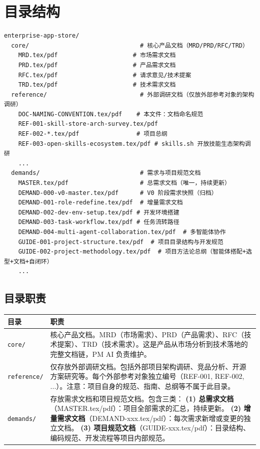 \documentclass[11pt,a4paper]{article}
\begin{document}
\section{目录结构}

\begin{lstlisting}[basicstyle=\ttfamily\footnotesize, frame=single]
enterprise-app-store/
  core/                               # 核心产品文档（MRD/PRD/RFC/TRD）
    MRD.tex/pdf                     # 市场需求文档
    PRD.tex/pdf                     # 产品需求文档
    RFC.tex/pdf                     # 请求意见/技术提案
    TRD.tex/pdf                     # 技术需求文档
  reference/                          # 外部调研文档（仅放外部参考对象的架构调研）
    DOC-NAMING-CONVENTION.tex/pdf    # 本文件：文档命名规范
    REF-001-skill-store-arch-survey.tex/pdf
    REF-002-*.tex/pdf                # 项目总纲
    REF-003-open-skills-ecosystem.tex/pdf # skills.sh 开放技能生态架构调研
    ...
  demands/                            # 需求与项目规范文档
    MASTER.tex/pdf                    # 总需求文档（唯一，持续更新）
    DEMAND-000-v0-master.tex/pdf      # V0 阶段需求快照（归档）
    DEMAND-001-role-redefine.tex/pdf  # 增量需求文档
    DEMAND-002-dev-env-setup.tex/pdf # 开发环境搭建
    DEMAND-003-task-workflow.tex/pdf # 任务流转路径
    DEMAND-004-multi-agent-collaboration.tex/pdf  # 多智能体协作
    GUIDE-001-project-structure.tex/pdf  # 项目目录结构与开发规范
    GUIDE-002-project-methodology.tex/pdf  # 项目方法论总纲（智能体搭配+选型+文档+自闭环）
    ...
\end{lstlisting}

\subsection{目录职责}

\begin{table}[h]
\centering
\begin{tabular}{lp{9cm}}
\toprule
\textbf{目录} & \textbf{职责} \\
\midrule
\texttt{core/} & 核心产品文档。MRD（市场需求）、PRD（产品需求）、RFC（技术提案）、TRD（技术需求）。这是产品从市场分析到技术落地的完整文档链，PM AI 负责维护。 \\
\texttt{reference/} & 仅存放外部调研文档。包括外部项目架构调研、竞品分析、开源方案研究等。每个外部参考对象独立编号（REF-001, REF-002, ...）。注意：项目自身的规范、指南、总纲等不属于此目录。 \\
\texttt{demands/} & 存放需求文档和项目规范文档。包含三类：
\textbf{(1) 总需求文档}（MASTER.tex/pdf）：项目全部需求的汇总，持续更新。
\textbf{(2) 增量需求文档}（DEMAND-xxx.tex/pdf）：每次需求新增或变更的独立文档。
\textbf{(3) 项目规范文档}（GUIDE-xxx.tex/pdf）：目录结构、编码规范、开发流程等项目内部规范。 \\
\bottomrule
\end{tabular}
\end{table}
\end{document}
